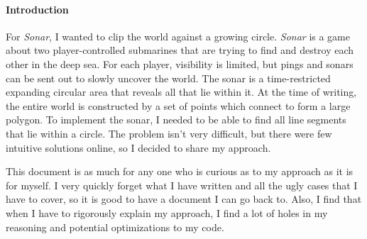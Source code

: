 \documentclass[12pt]{article}
\begin{document}
\maketitle

\paragraph{Introduction}
For \emph{Sonar}, I wanted to clip the world against a growing circle.
\emph{Sonar} is a game about two player-controlled submarines that are trying to find and destroy each other in the deep sea.
For each player, visibility is limited, but pings and sonars can be sent out to slowly uncover the world.
The sonar is a time-restricted expanding circular area that reveals all that lie within it.
At the time of writing, the entire world is constructed by a set of points which connect to form a large polygon.
To implement the sonar, I needed to be able to find all line segments that lie within a circle.
The problem isn't very difficult, but there were few intuitive solutions online, so I decided to share my approach.

This document is as much for any one who is curious as to my approach as it is for myself.
I very quickly forget what I have written and all the ugly cases that I have to cover, so it is good to have a document I can go back to.
Also, I find that when I have to rigorously explain my approach, I find a lot of holes in my reasoning and potential optimizations to my code.
\end{document}

